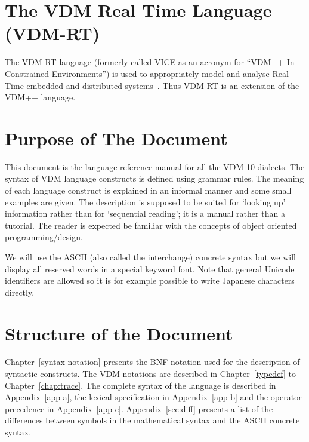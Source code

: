 \documentclass{overturerepchap}
\begin{document}
\section{The VDM Real Time Language (VDM-RT)}

The VDM-RT language (formerly called VICE as an acronym for ``VDM++ In
Constrained Environments'') is used to appropriately model and analyse
Real-Time embedded and distributed
systems~\cite{Mukherjee&00,Verhoef&06b,Verhoef&07,Verhoef08,Larsen&09b}. Thus
VDM-RT is an extension of the VDM++ language.

\section{Purpose of The Document}

This document is the language reference manual for all the VDM-10 dialects.  The
syntax of VDM language constructs is defined using grammar rules.
The meaning of each language construct is explained in an informal
manner and some small examples are given. The description is supposed
to be suited for `looking up' information rather than for `sequential
reading'; it is a manual rather than a tutorial.  The reader is
expected be familiar with the concepts of object oriented
programming/design.

We will use the ASCII (also called the interchange)
concrete syntax but we will display all reserved words in a special
keyword font. Note that general Unicode identifiers are allowed so
it is for example possible to write Japanese characters directly.

\section{Structure of the Document}

Chapter~\ref{syntax-notation} presents the BNF notation used for the
description of syntactic constructs.  The VDM notations are described
in Chapter~\ref{typedef} to Chapter~\ref{chap:trace}.
The complete syntax of the language is described in
Appendix~\ref{app-a}, the lexical specification in
Appendix~\ref{app-b} and the operator precedence in
Appendix~\ref{app-c}. Appendix~\ref{sec:diff} presents a list of the
differences between symbols in the mathematical syntax and the ASCII
concrete syntax.
\end{document}

